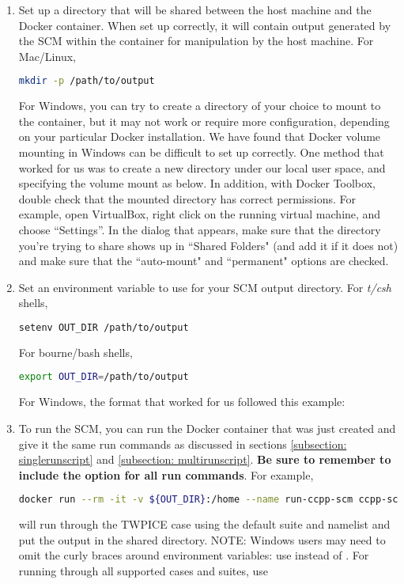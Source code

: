 \begin{enumerate}
\item Set up a directory that will be shared between the host machine and the Docker container. When set up correctly, it will contain output generated by the SCM within the container for manipulation by the host machine. For Mac/Linux,
\begin{lstlisting}[language=bash]
mkdir -p /path/to/output
\end{lstlisting}
For Windows, you can try to create a directory of your choice to mount to the container, but it may not work or require more configuration, depending on your particular Docker installation. We have found that Docker volume mounting in Windows can be difficult to set up correctly. One method that worked for us was to create a new directory under our local user space, and specifying the volume mount as below. In addition, with Docker Toolbox, double check that the mounted directory has correct permissions. For example, open VirtualBox, right click on the running virtual machine, and choose ``Settings''. In the dialog that appears, make sure that the directory you're trying to share shows up in ``Shared Folders" (and add it if it does not) and make sure that the ``auto-mount" and ``permanent" options are checked.
\item Set an environment variable to use for your SCM output directory. For \textit{t/csh} shells,
\begin{lstlisting}[language=bash]
setenv OUT_DIR /path/to/output
\end{lstlisting}
For bourne/bash shells,
\begin{lstlisting}[language=bash]
export OUT_DIR=/path/to/output
\end{lstlisting}
For Windows, the format that worked for us followed this example: 
\item To run the SCM, you can run the Docker container that was just created and give it the same run commands as discussed in sections \ref{subsection: singlerunscript} and \ref{subsection: multirunscript}. \textbf{Be sure to remember to include the  option for all run commands}. For example,
\begin{lstlisting}[language=bash]
docker run --rm -it -v ${OUT_DIR}:/home --name run-ccpp-scm ccpp-scm ./run_scm.py -c twpice -d
\end{lstlisting}
will run through the TWPICE case using the default suite and namelist and put the output in the shared directory. NOTE: Windows users may need to omit the curly braces around environment variables: use  instead of . For running through all supported cases and suites, use

\end{enumerate}
